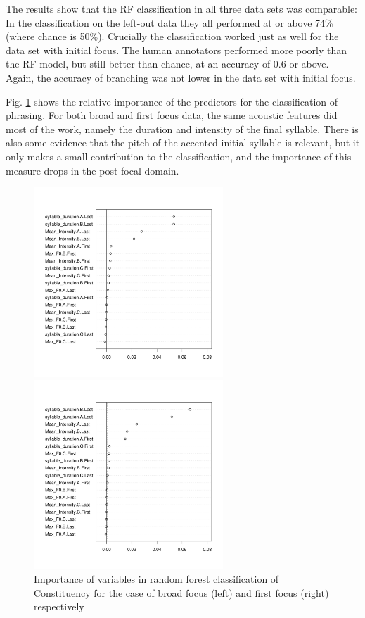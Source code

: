 \documentclass[preprint,review,12pt,authoryear,times]{elsarticle}
\begin{document}


The results show that the RF classification in all three data sets was comparable: In the classification on the left-out data they all performed at or above 74\% (where chance is 50\%). Crucially the classification worked just as well for the data set with initial focus. The human annotators performed more poorly than the RF model, but still better than chance, at an accuracy of 0.6 or above. Again, the accuracy of branching was not lower in the data set with initial focus.

Fig. \ref{phrasingForest} shows the relative importance of the predictors for the classification of phrasing. For both broad and first focus data, the same acoustic features did most of the work, namely the duration and intensity of the final syllable. There is also some evidence that the pitch of the accented initial syllable is relevant, but it only makes a small contribution to the classification, and the importance of this measure drops in the post-focal domain. 


\begin{figure}[ht!]
	\begin{center}
	{\footnotesize
	        \parbox{2.8in}{
		\includegraphics[width=2.8in]{Figures/phrasingBroadVarimp.pdf}
		}\parbox{3.5in}{
		\includegraphics[width=2.8in]{Figures/phrasingFirstVarimp.pdf}
		}
		}
		\caption{Importance of variables in random forest classification of Constituency for the case of broad focus (left) and first focus (right) respectively}
		\label{phrasingForest}
	\end{center}
\end{figure}
\end{document}
